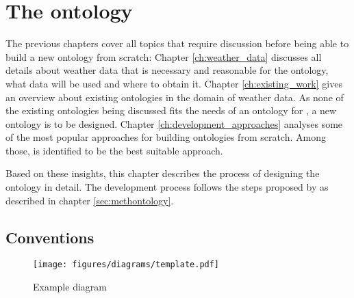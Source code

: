 
\chapter{The \thinkhomeweather ontology}
\label{ch:thinkhomeweather_ontology}





The previous chapters cover all topics that require discussion before being able to build a new ontology from scratch: Chapter \ref{ch:weather_data} discusses all details about weather data that is necessary and reasonable for the \thinkhomeweather ontology, what data will be used and where to obtain it. Chapter \ref{ch:existing_work} gives an overview about existing ontologies in the domain of weather data. As none of the existing ontologies being discussed fits the needs of an ontology for \thinkhome, a new ontology is to be designed. Chapter \ref{ch:development_approaches} analyses some of the most popular approaches for building ontologies from scratch. Among those, \methontology \cite{Methontology} is identified to be the best suitable approach.

Based on these insights, this chapter describes the process of designing the \thinkhomeweather ontology in detail. The development process follows the steps proposed by \methontology as described in chapter \ref{sec:methontology}.

\section{Conventions}
\label{sec:ontology_conventions}

\begin{figure}
  \texttt{[image: figures/diagrams/template.pdf]}
  \caption{Example diagram}
  \label{fig:diagram_example}
\end{figure}


